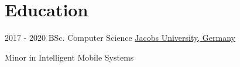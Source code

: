 \documentclass[letterpaper]{twentysecondcv} %
\begin{document}
\makeprofile %

\section{Education}

\begin{twenty} %
	\twentyitem
    	{2017 - 2020}
        {}
        {BSc. Computer Science}
        {\href{https://www.jacobs-university.de}{Jacobs University, Germany}}
        {Minor in Intelligent Mobile Systems
        
        }
        
\end{twenty}

        

\end{document}
